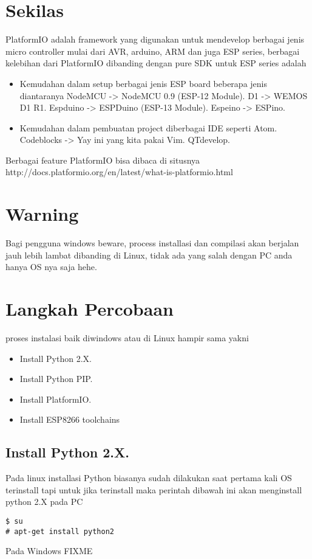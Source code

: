 \section{Sekilas}
PlatformIO adalah framework yang digunakan untuk mendevelop berbagai jenis micro controller mulai dari AVR, arduino, ARM dan juga ESP series, berbagai kelebihan dari PlatformIO dibanding dengan pure SDK untuk ESP series adalah
\begin{itemize}
\item Kemudahan dalam setup berbagai jenis ESP board beberapa jenis diantaranya
\subitem NodeMCU -> NodeMCU 0.9 (ESP-12 Module).
\subitem D1 -> WEMOS D1 R1.
\subitem Espduino -> ESPDuino (ESP-13 Module).
\subitem Espeino -> ESPino.
\item Kemudahan dalam pembuatan project diberbagai IDE seperti
\subitem Atom.
\subitem Codeblocks -> Yay ini yang kita pakai
\subitem Vim.
\subitem QTdevelop.
\end{itemize}
Berbagai feature PlatformIO bisa dibaca di situsnya \newline 
http://docs.platformio.org/en/latest/what-is-platformio.html

\section{Warning}
Bagi pengguna windows beware, process installasi dan compilasi akan berjalan jauh lebih lambat dibanding di Linux, tidak ada yang salah dengan PC anda hanya OS nya saja hehe.

\newpage
\section{Langkah Percobaan}
proses instalasi baik diwindows atau di Linux hampir sama yakni
\begin{itemize}
\item Install Python 2.X.
\item Install Python PIP.
\item Install PlatformIO.
\item Install ESP8266 toolchains
\end{itemize}
\subsection{Install Python 2.X.}
Pada linux installasi Python biasanya sudah dilakukan saat pertama kali OS terinstall tapi untuk jika terinstall maka perintah dibawah ini akan menginstall python 2.X pada PC
\begin{lstlisting}[style=bash]
$ su
# apt-get install python2
\end{lstlisting}
Pada Windows FIXME

